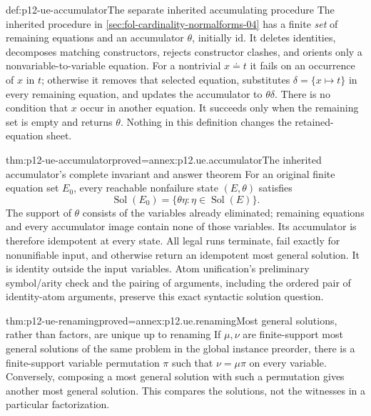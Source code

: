 \begin{hbdefinition}{def:p12-ue-accumulator}{The separate inherited accumulating procedure}
The inherited procedure in \cref{sec:fol-cardinality-normalforms-04}
has a finite \emph{set} of remaining equations and an accumulator
\(\theta\), initially \(\mathrm{id}\). It deletes identities,
decomposes matching constructors, rejects constructor clashes, and
orients only a nonvariable-to-variable equation. For a nontrivial
\(x\doteq t\) it fails on an occurrence of \(x\) in \(t\);
otherwise it removes that selected equation, substitutes
\(\delta=\{x\mapsto t\}\) in every remaining equation, and updates
the accumulator to \(\theta\delta\). There is no condition that
\(x\) occur in another equation. It succeeds only when the remaining
set is empty and returns \(\theta\). Nothing in this definition
changes the retained-equation sheet.
\end{hbdefinition}

\begin{hbtheorem}{thm:p12-ue-accumulator}{proved=annex:p12.ue.accumulator}{The inherited accumulator's complete invariant and answer theorem}
For an original finite equation set \(E_0\), every reachable nonfailure
state \((E,\theta)\) satisfies
\[
 \operatorname{Sol}(E_0)
       =\{\theta\eta:\eta\in\operatorname{Sol}(E)\}.
\]
The support of \(\theta\) consists of the variables already eliminated;
remaining equations and every accumulator image contain none of those
variables. Its accumulator is therefore idempotent at every state.
All legal runs terminate, fail exactly for nonunifiable input, and
otherwise return an idempotent most general solution. It is identity
outside the input variables. Atom unification's preliminary symbol/arity
check and the pairing of arguments, including the ordered pair of
identity-atom arguments, preserve this exact syntactic solution question.
\end{hbtheorem}

\begin{hbtheorem}{thm:p12-ue-renaming}{proved=annex:p12.ue.renaming}{Most general solutions, rather than factors, are unique up to renaming}
If \(\mu,\nu\) are finite-support most general solutions of the same
problem in the global instance preorder, there is a finite-support
variable permutation \(\pi\) such that \(\nu=\mu\pi\) on every
variable. Conversely, composing a most general solution with such a
permutation gives another most general solution. This compares the
solutions, not the witnesses in a particular factorization.
\end{hbtheorem}

